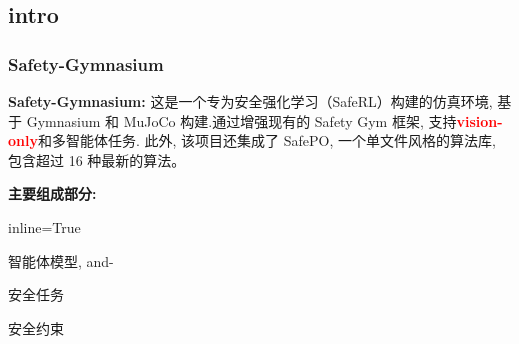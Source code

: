 \documentclass[10pt,mathserif]{beamer}%
\begin{document}
\subsection{intro}
\begin{frame}[t, fragile]
\frametitle{Safety-Gymnasium}

\begin{minipage}[t]{\textwidth}
   \textbf{Safety-Gymnasium:} 这是一个专为安全强化学习（SafeRL）构建的仿真环境, 基于 Gymnasium 和 MuJoCo 构建.通过增强现有的 Safety Gym 框架, 支持\textbf{\textcolor{red}{vision-only}}和多智能体任务. 此外, 该项目还集成了 SafePO, 一个单文件风格的算法库, 包含超过 16 种最新的算法。
   
   \vspace{0.3cm}
   
   \textbf{主要组成部分:}
   \vspace{0.2cm}

\begin{enumerate*}{inline=True}
    \item 智能体模型, and-
    \item 安全任务
    \item 安全约束
\end{enumerate*}
\end{minipage}


\vfill
\begin{minipage}[bp]{\textwidth}


\end{minipage}
\end{frame}
\end{document}
